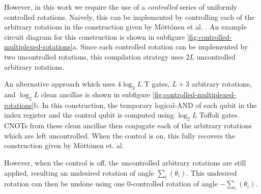 However, in this work we require the use of a \textit{controlled} series of uniformly controlled rotations.
Naively, this can be implemented by controlling each of the arbitrary rotations in the construction given by Möttönen et al. \cite{mottonen2004transformation}.
An example circuit diagram for this construction is shown in subfigure \ref{fig:controlled-multiplexed-rotations}a.
Since each controlled rotation can be implemented by two uncontrolled rotations, this compilation strategy uses $2L$ uncontrolled arbitrary rotations.

An alternative approach which uses $4 \log_2 L$ T gates, $L + 3$ arbitrary rotations, and $\log_2 L$ clean ancillae is shown in subfigure \ref{fig:controlled-multiplexed-rotations}b.
In this construction, the temporary logical-AND of each qubit in the index register and the control qubit is computed using $\log_2 L$ Toffoli gates.
CNOTs from these clean ancillae then conjugate each of the arbitrary rotations which are left uncontrolled.
When the control is on, this fully recovers the construction given by Möttönen et. al.

However, when the control is off, the uncontrolled arbitrary rotations are still applied, resulting an undesired rotation of angle $\sum_{i} (\theta_i)$.
This undesired rotation can then be undone using one $0$-controlled rotation of angle $- \sum_{i} (\theta_i)$.
